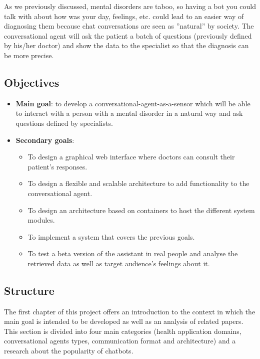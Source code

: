 \documentclass[12pt,english]{article}
\begin{document}
As we previously discussed, mental disorders are taboo, so having a bot you could talk with about how was your day, feelings, etc. could lead to an easier way of diagnosing them because chat conversations are seen as ''natural'' by society. The conversational agent will ask the patient a batch of questions (previously defined by his/her doctor) and show the data to the specialist so that the diagnosis can be more precise.

\newpage

\subsection{Objectives}

\begin{itemize}
  \item \textbf{Main goal}: to develop a conversational-agent-as-a-sensor which will be able to interact with a person with a mental disorder in a natural way and ask questions defined by specialists.
  \item \textbf{Secondary goals}:
    \begin{itemize}
      \item To design a graphical web interface where doctors can consult their patient's responses.
      \item To design a flexible and scalable architecture to add functionality to the conversational agent.
      \item To design an architecture based on containers to host the different system modules.
      \item To implement a system that covers the previous goals.
      \item To test a beta version of the assistant in real people and analyse the retrieved data as well as target audience's feelings about it.
    \end{itemize}
\end{itemize}

\subsection{Structure}

The first chapter of this project offers an introduction to the context in which the main goal is intended to be developed as well as an analysis of related papers. This section is divided into four main categories (health application domains, conversational agents types, communication format and architecture) and a research about the popularity of chatbots.\\
\end{document}
